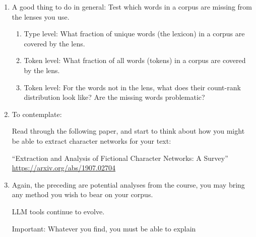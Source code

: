 \begin{enumerate}
  
  
   \solutionstart


   \solutionend

\item

  A good thing to do in general: Test which words in a corpus are missing from the lenses you use.

  \begin{enumerate}
  \item
    Type level: What fraction of unique words (the lexicon) in a corpus are covered by the lens.
  \item
    Token level: What fraction of all words (tokens) in a corpus are covered by the lens.
  \item
    Token level: For the words not in the lens, what does their count-rank distribution look like?
    Are the missing words problematic?
  \end{enumerate}

  

\item
  To contemplate:

  Read through the following paper, and start to think about how you might be able
  to extract character networks for your text:

  ``Extraction and Analysis of Fictional Character Networks: A Survey''
  \url{https://arxiv.org/abs/1907.02704}

\item
  Again, the preceding are potential analyses from the course, you may bring any method you wish to
  bear on your corpus.

  LLM tools continue to evolve.

  Important: Whatever you find, you must be able to explain
  
\end{enumerate}



